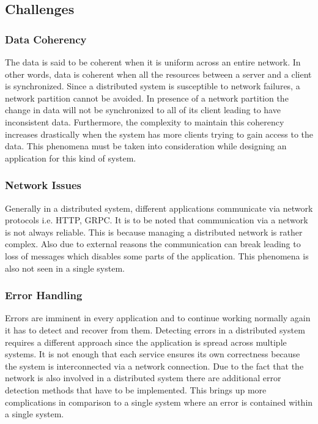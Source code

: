     \subsection{Challenges}    
        \label{subsection: distriChallenges}
        \subsubsection{Data Coherency}
        The data is said to be coherent when it is uniform across an entire network. In other words, data is coherent when all
        the resources between a server and a client is synchronized. 
        Since a distributed system is susceptible to network failures, a network partition \cite[p.~59]{CAP} cannot be avoided. In presence
        of a network partition the change in data will not be synchronized to all of its client leading to have inconsistent data. Furthermore, the
        complexity to maintain this coherency increases drastically when the system has more clients trying to gain access to the data. This phenomena
        must be taken into consideration while designing an application for this kind of system.

        \subsubsection{Network Issues}
        Generally in a distributed system, different applications communicate via network protocols i.e. HTTP, GRPC. It is to be noted that
        communication via a network is not always reliable. This is because managing a distributed network is rather complex. Also due to
        external reasons the communication can break leading to loss of messages which disables some parts of the application. 
        This phenomena is also not seen in a single system.

        \subsubsection{Error Handling}
        Errors are imminent in every application and to continue working normally again it has to detect and recover from them.
        Detecting errors in a distributed system requires a different approach since the application is spread across multiple systems. 
        It is not enough that each service ensures its own correctness because the system is interconnected via a
        network connection. Due to the fact that the network is also involved in a distributed system there are additional error detection methods that have
        to be implemented. This brings up more complications in comparison to a single system where an error is contained within a single system.

         

